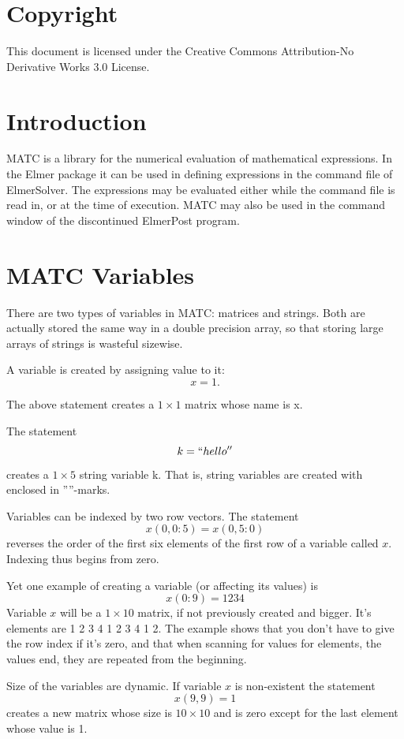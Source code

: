 \section*{Copyright}

This document is licensed under the Creative Commons Attribution-No Derivative Works 3.0 License. 


\section{Introduction}
MATC is a library for the numerical evaluation of mathematical expressions. In the Elmer 
package it can be used in defining expressions in the command file of ElmerSolver. The expressions
may be evaluated either while the command file is read in, or at the time of execution.
MATC may also be used in the command window of the discontinued ElmerPost program.


\section{MATC Variables}

There are two types of variables in MATC: matrices and strings. 
Both are actually stored the same way in a double precision array, so that storing large arrays of strings is wasteful sizewise. 

A variable is created by assigning value to it: 
\[
  x = 1. 
\]
 
The above statement creates a $1 \times 1$ matrix whose name is x. 

The statement 
\[
  k = ``hello''
\]
 creates a $1 \times 5$ string variable k. That is, string variables are created with enclosed in ''''-marks. 

Variables can be indexed by two row vectors. The statement 
\[
   x(0,0:5) = x(0,5:0)
\]
reverses the order of the first six elements of the first row of a variable called $x$. 
Indexing thus begins from zero. 

Yet one example of creating a variable (or affecting its values) is 
\[
  x(0:9) = 1 2 3 4
\]
 Variable $x$ will be a $1 \times 10$ matrix, if not previously created and bigger. 
It's elements are 1 2 3 4 1 2 3 4 1 2.
The example shows that you don't have to give the row index if it's zero, and that when scanning for values for elements, the values end, they are repeated from the beginning. 

Size of the variables are dynamic. If variable $x$ is non-existent the statement 
\[
  x(9,9) = 1
\]
creates a new matrix whose size is $10 \times 10$ and is zero except for the last element whose value is 1. 

